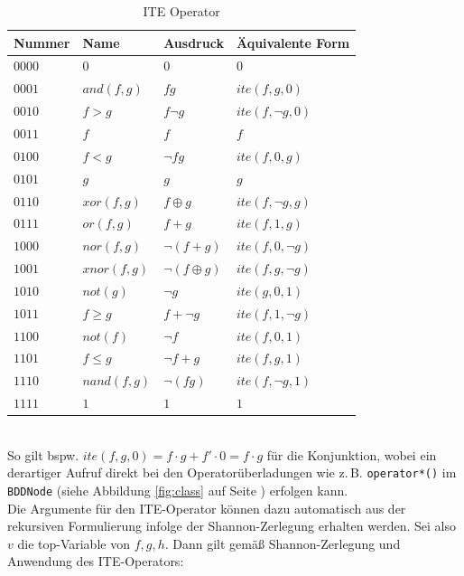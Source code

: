 \begin{table}[bth]
	\centering
	\caption{ITE Operator}
	\label{tab:ite}
	\begin{tabular}{ | l | l | l | l | }
		\hline
		\textbf{Nummer} & \textbf{Name} & \textbf{Ausdruck} & \textbf{Äquivalente Form} \\ \hline
		$0000$ & $0$ & $0$ & $0$ \\ \hline
		$0001$ & $and(f,g)$ & $fg$ & $ite(f,g,0)$ \\ \hline
		$0010$ & $f > g$ & $f\neg g$ & $ite(f,\neg g,0)$ \\ \hline
		$0011$ & $f$ & $f$ & $f$ \\ \hline
		$0100$ & $f < g$ & $\neg fg$ & $ite(f,0,g)$ \\ \hline
		$0101$ & $g$ & $g$ & $g$ \\ \hline
		$0110$ & $xor(f,g)$ & $f \oplus g$ & $ite(f,\neg g,g)$ \\ \hline
		$0111$ & $or(f,g)$ & $f+g$ & $ite(f,1,g)$ \\ \hline
		$1000$ & $nor(f,g)$ & $\neg (f+g)$ & $ite(f,0,\neg g)$ \\ \hline
		$1001$ & $xnor(f,g)$ & $\neg (f \oplus g)$ & $ite(f,g,\neg g)$ \\ \hline
		$1010$ & $not(g)$ & $\neg g$ & $ite(g,0,1)$ \\ \hline
		$1011$ & $f \geq g$ & $f + \neg g$ & $ite(f,1,\neg g)$ \\ \hline
		$1100$ & $not(f)$ & $\neg f$ & $ite(f,0,1)$ \\ \hline
		$1101$ & $f \leq g$ & $\neg f + g$ & $ite(f,g,1)$ \\ \hline
		$1110$ & $nand(f,g)$ & $\neg (fg)$ & $ite(f,\neg g,1)$ \\ \hline
		$1111$ & $1$ & $1$ & $1$ \\ \hline
	\end{tabular}
\end{table}\\
\noindent
So gilt bspw. $ite(f, g, 0) = f \cdot g + f' \cdot 0 = f \cdot g$ für die Konjunktion, wobei ein derartiger Aufruf direkt bei den Operatorüberladungen wie z.\,B. \texttt{operator*()} im \texttt{BDDNode} (siehe Abbildung \ref{fig:class} auf Seite \pageref{fig:class}) erfolgen kann.\\
Die Argumente für den ITE-Operator können dazu automatisch aus der rekursiven Formulierung infolge der Shannon-Zerlegung erhalten werden. Sei also $v$ die top-Variable von $f, g, h$. Dann gilt gemäß Shannon-Zerlegung und Anwendung des ITE-Operators:\\
